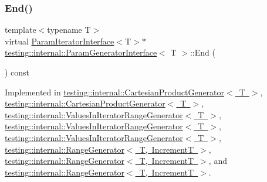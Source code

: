 \subsubsection{\texorpdfstring{End()}{End()}\hspace{0.1cm}{\footnotesize\ttfamily [1/3]}}
{\footnotesize\ttfamily template$<$typename T$>$ \\
virtual \mbox{\hyperlink{classtesting_1_1internal_1_1_param_iterator_interface}{Param\+Iterator\+Interface}}$<$T$>$$\ast$ \mbox{\hyperlink{classtesting_1_1internal_1_1_param_generator_interface}{testing\+::internal\+::\+Param\+Generator\+Interface}}$<$ T $>$\+::End (\begin{DoxyParamCaption}{ }\end{DoxyParamCaption}) const\hspace{0.3cm}{\ttfamily [pure virtual]}}



Implemented in \mbox{\hyperlink{classtesting_1_1internal_1_1_cartesian_product_generator_ae072dcf8400ac9dd5692e417262a664b}{testing\+::internal\+::\+Cartesian\+Product\+Generator$<$ T $>$}}, \mbox{\hyperlink{classtesting_1_1internal_1_1_cartesian_product_generator_ae072dcf8400ac9dd5692e417262a664b}{testing\+::internal\+::\+Cartesian\+Product\+Generator$<$ T $>$}}, \mbox{\hyperlink{classtesting_1_1internal_1_1_values_in_iterator_range_generator_a298cfb66a90b1a39c0cea3ca7ae1ece1}{testing\+::internal\+::\+Values\+In\+Iterator\+Range\+Generator$<$ T $>$}}, \mbox{\hyperlink{classtesting_1_1internal_1_1_values_in_iterator_range_generator_a298cfb66a90b1a39c0cea3ca7ae1ece1}{testing\+::internal\+::\+Values\+In\+Iterator\+Range\+Generator$<$ T $>$}}, \mbox{\hyperlink{classtesting_1_1internal_1_1_values_in_iterator_range_generator_a4af95b9eccfc86c40a715df2d9d0df40}{testing\+::internal\+::\+Values\+In\+Iterator\+Range\+Generator$<$ T $>$}}, \mbox{\hyperlink{classtesting_1_1internal_1_1_range_generator_ac112ca69567b9c47bf14554e0473e1e2}{testing\+::internal\+::\+Range\+Generator$<$ T, Increment\+T $>$}}, \mbox{\hyperlink{classtesting_1_1internal_1_1_range_generator_ac112ca69567b9c47bf14554e0473e1e2}{testing\+::internal\+::\+Range\+Generator$<$ T, Increment\+T $>$}}, and \mbox{\hyperlink{classtesting_1_1internal_1_1_range_generator_a8d2acbb733791a14df6e7bd3754e9003}{testing\+::internal\+::\+Range\+Generator$<$ T, Increment\+T $>$}}.

\mbox{\label{classtesting_1_1internal_1_1_param_generator_interface_afa7211b74990e11d3fc7ad4e7113da4f}} 

